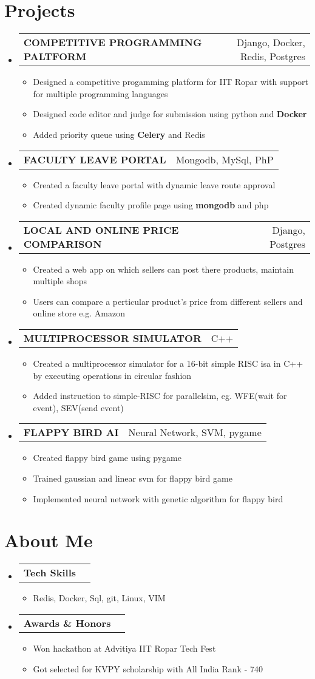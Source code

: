 \documentclass[letterpaper,11pt]{article}
\makeatletter
\newcommand{\resumeSimpleItem}[1]{
    \item\small{
        {#1}
    }
}
\newcommand{\resumeSimpleSubheading}[2]{
  \vspace{-1pt}\item
    \begin{tabular*}{0.97\textwidth}[t]{l@{\extracolsep{\fill}}r}
      \textbf{#1} & #2 \\
    \end{tabular*}\vspace{-5pt}
}
\newcommand{\resumeListTitle}[1]{
    \vspace{-1pt}\item
    \begin{tabular*}{0.97\textwidth}[t]{l@{\extracolsep{\fill}}r}
        \textbf{#1} \\
    \end{tabular*}\vspace{-5pt}
}
\newcommand{\resumeSubHeadingListStart}{\begin{itemize}[leftmargin=*]}
\newcommand{\resumeSubHeadingListEnd}{\end{itemize}}
\newcommand{\resumeItemListStart}{\begin{itemize}}
\newcommand{\resumeItemListEnd}{\end{itemize}\vspace{-5pt}}
\makeatother
\begin{document}
\section{Projects}
  \resumeSubHeadingListStart
    \resumeSimpleSubheading
    {COMPETITIVE PROGRAMMING PALTFORM}{Django, Docker, Redis, Postgres}
    \resumeItemListStart
      \resumeSimpleItem {Designed a competitive progamming platform for IIT Ropar with support for multiple programming languages}
      \resumeSimpleItem {Designed code editor and judge for submission using python and \textbf{Docker}}
      \resumeSimpleItem {Added priority queue using \textbf{Celery} and Redis}
    \resumeItemListEnd
    \resumeSimpleSubheading
    {FACULTY LEAVE PORTAL} {Mongodb, MySql, PhP}
    \resumeItemListStart
      \resumeSimpleItem {Created a faculty leave portal with dynamic leave route approval}
      \resumeSimpleItem {Created dynamic faculty profile page using \textbf{mongodb} and php}
    \resumeItemListEnd
    \resumeSimpleSubheading
    {LOCAL AND ONLINE PRICE COMPARISON}{Django, Postgres}
    \resumeItemListStart
        \resumeSimpleItem {Created a web app on which sellers can post there products, maintain multiple shops}
        \resumeSimpleItem {Users can compare a perticular product's price from different sellers and online store e.g. Amazon}
    \resumeItemListEnd
    \resumeSimpleSubheading
    {MULTIPROCESSOR SIMULATOR}{C++}
    \resumeItemListStart
      \resumeSimpleItem {Created a multiprocessor simulator for a 16-bit simple RISC isa in C++ by executing operations in circular fashion}
      \resumeSimpleItem {Added instruction to simple-RISC for parallelsim, eg. WFE(wait for event), SEV(send event)}
    \resumeItemListEnd
    \resumeSimpleSubheading
    {FLAPPY BIRD AI} {Neural Network, SVM, pygame}
    \resumeItemListStart
      \resumeSimpleItem {Created flappy bird game using pygame}
      \resumeSimpleItem {Trained gaussian and linear svm for flappy bird game}
      \resumeSimpleItem {Implemented neural network with genetic algorithm for flappy bird}
    \resumeItemListEnd
    \resumeSubHeadingListEnd



\section{About Me}
 \resumeSubHeadingListStart
    \resumeListTitle{Tech Skills}
        \resumeItemListStart
            \resumeSimpleItem{Redis, Docker, Sql, git, Linux, VIM}
        \resumeItemListEnd
    \resumeListTitle{Awards \& Honors}
        \resumeItemListStart
            \resumeSimpleItem{Won hackathon at Advitiya IIT Ropar Tech Fest}
            \resumeSimpleItem{Got selected for KVPY scholarship with All India Rank - 740}
        \resumeItemListEnd
 \resumeSubHeadingListEnd
 
\end{document}
